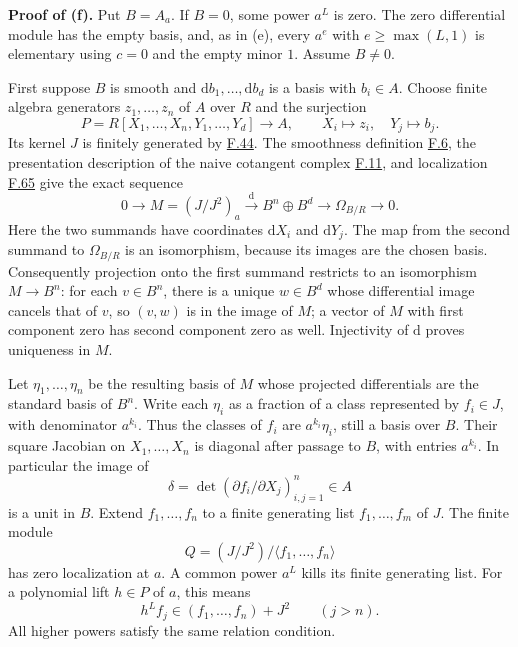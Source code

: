 \documentclass[11pt,a4paper,openany]{report}
\begin{document}
\textbf{Proof of (f).} Put \(B=A_a\). If \(B=0\), some power \(a^L\) is zero. The zero differential module has the empty basis, and, as in (e), every \(a^e\) with \(e\ge\max(L,1)\) is elementary using \(c=0\) and the empty minor \(1\). Assume \(B\ne0\).

First suppose \(B\) is smooth and \(\mathrm db_1,\ldots,\mathrm db_d\) is a basis with \(b_i\in A\). Choose finite algebra generators \(z_1,\ldots,z_n\) of \(A\) over \(R\) and the surjection \[P=R[X_1,\ldots,X_n,Y_1,\ldots,Y_d]\longrightarrow A,
\qquad X_i\longmapsto z_i,\quad Y_j\longmapsto b_j.\] Its kernel \(J\) is finitely generated by \hyperref[AG-RG-S05-algebra-lemma-finite-presentation-independent]{F.44}. The smoothness definition \hyperref[AG-RG-S05-algebra-definition-smooth]{F.6}, the presentation description of the naive cotangent complex \hyperref[AG-RG-S05-algebra-lemma-NL-homotopy]{F.11}, and localization \hyperref[AG-RG-S05-algebra-lemma-localize-NL]{F.65} give the exact sequence \[0\longrightarrow M=(J/J^2)_a\xrightarrow{\mathrm d}
B^n\oplus B^d\longrightarrow\Omega_{B/R}\longrightarrow0.\] Here the two summands have coordinates \(\mathrm dX_i\) and \(\mathrm dY_j\). The map from the second summand to \(\Omega_{B/R}\) is an isomorphism, because its images are the chosen basis. Consequently projection onto the first summand restricts to an isomorphism \(M\to B^n\): for each \(v\in B^n\), there is a unique \(w\in B^d\) whose differential image cancels that of \(v\), so \((v,w)\) is in the image of \(M\); a vector of \(M\) with first component zero has second component zero as well. Injectivity of \(\mathrm d\) proves uniqueness in \(M\).

Let \(\eta_1,\ldots,\eta_n\) be the resulting basis of \(M\) whose projected differentials are the standard basis of \(B^n\). Write each \(\eta_i\) as a fraction of a class represented by \(f_i\in J\), with denominator \(a^{k_i}\). Thus the classes of \(f_i\) are \(a^{k_i}\eta_i\), still a basis over \(B\). Their square Jacobian on \(X_1,\ldots,X_n\) is diagonal after passage to \(B\), with entries \(a^{k_i}\). In particular the image of \[\delta=\det(\partial f_i/\partial X_j)_{i,j=1}^n\in A\] is a unit in \(B\). Extend \(f_1,\ldots,f_n\) to a finite generating list \(f_1,\ldots,f_m\) of \(J\). The finite module \[Q=(J/J^2)/\langle f_1,\ldots,f_n\rangle\] has zero localization at \(a\). A common power \(a^L\) kills its finite generating list. For a polynomial lift \(h\in P\) of \(a\), this means \[h^L f_j\in(f_1,\ldots,f_n)+J^2\qquad(j>n).\] All higher powers satisfy the same relation condition.
\end{document}
